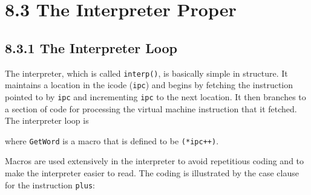 \section[8.3 The Interpreter Proper]{8.3 The Interpreter Proper}
\subsection[8.3.1 The Interpreter Loop]{8.3.1 The Interpreter Loop}

The interpreter, which is called \texttt{interp()}, is basically
simple in structure. It maintains a location in the icode
(\texttt{ipc}) and begins by fetching the instruction pointed to by
\texttt{ipc} and incrementing \texttt{ipc} to the next location. It
then branches to a section of code for processing the virtual machine
instruction that it fetched. The interpreter loop is

\goodbreak
{}

\noindent
where \texttt{GetWord} is a macro that is defined to be \texttt{(*ipc++)}.

Macros are used extensively in the interpreter to avoid repetitious
coding and to make the interpreter easier to read.  The coding is
illustrated by the case clause for the instruction \texttt{plus}:


